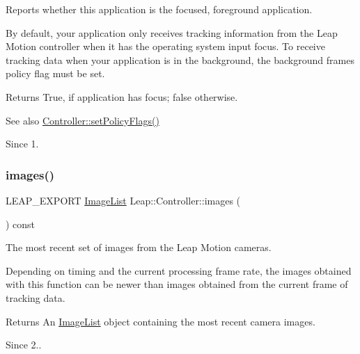 Reports whether this application is the focused, foreground application.

By default, your application only receives tracking information from the Leap Motion controller when it has the operating system input focus. To receive tracking data when your application is in the background, the background frames policy flag must be set.


\begin{DoxyCodeInclude}
\end{DoxyCodeInclude}


\begin{DoxyReturn}{Returns}
True, if application has focus; false otherwise.
\end{DoxyReturn}
\begin{DoxySeeAlso}{See also}
\hyperlink{class_leap_1_1_controller_a39499e27cca45521f1f8c4d7bbd66adf}{Controller\+::set\+Policy\+Flags()} 
\end{DoxySeeAlso}
\begin{DoxySince}{Since}
1. 
\end{DoxySince}
\mbox{\label{class_leap_1_1_controller_ac6fe10acc42b6c830e26fb8fbb88b895}} 
\subsubsection{\texorpdfstring{images()}{images()}}
{\footnotesize\ttfamily L\+E\+A\+P\+\_\+\+E\+X\+P\+O\+RT \hyperlink{class_leap_1_1_image_list}{Image\+List} Leap\+::\+Controller\+::images (\begin{DoxyParamCaption}{ }\end{DoxyParamCaption}) const}

The most recent set of images from the Leap Motion cameras.


\begin{DoxyCodeInclude}
\end{DoxyCodeInclude}


Depending on timing and the current processing frame rate, the images obtained with this function can be newer than images obtained from the current frame of tracking data.

\begin{DoxyReturn}{Returns}
An \hyperlink{class_leap_1_1_image_list}{Image\+List} object containing the most recent camera images. 
\end{DoxyReturn}
\begin{DoxySince}{Since}
2.. 
\end{DoxySince}
\mbox{\label{class_leap_1_1_controller_a38835f744f2c56ae8914378b75085f14}} 
